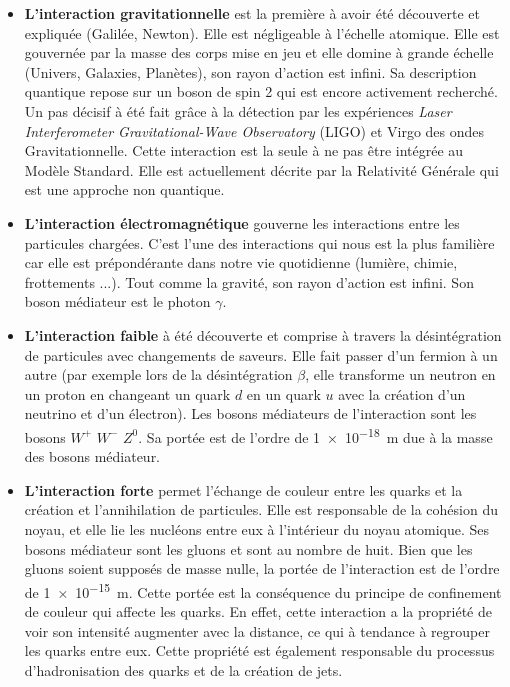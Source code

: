 \begin{itemize}[label=$\bullet$]
\item \textbf{L'interaction gravitationnelle} est la première à avoir été découverte et expliquée (Galilée, Newton). Elle est négligeable à l'échelle atomique. Elle est gouvernée par la masse des corps mise en jeu et elle domine à grande échelle (Univers, Galaxies, Planètes), son rayon d'action est infini. Sa description quantique repose sur un boson de spin \num{2} qui est encore activement recherché. Un pas décisif à été fait grâce à la détection par les expériences \textit{Laser Interferometer Gravitational-Wave Observatory} (LIGO) et Virgo des ondes Gravitationnelle. Cette interaction est la seule à ne pas être intégrée au Modèle Standard. Elle est actuellement décrite par la Relativité Générale qui est une approche non quantique.

\item \textbf{L'interaction électromagnétique} gouverne les interactions entre les particules chargées. C'est l'une des interactions qui nous est la plus familière car elle est prépondérante dans notre vie quotidienne (lumière, chimie, frottements ...). Tout comme la gravité, son rayon d'action est infini. Son boson médiateur est le photon $\gamma$.

\item \textbf{L'interaction faible} à été découverte et comprise à travers la désintégration de particules avec changements de saveurs. Elle fait passer d'un fermion à un autre (par exemple lors de la désintégration $\beta$, elle transforme un neutron en un proton en changeant un quark $d$ en un quark $u$ avec la création d'un neutrino et d'un électron). Les bosons médiateurs de l'interaction sont les bosons $W^{+}$ $W^{-}$ $Z^{0}$. Sa portée est de l'ordre de \SI{1e-18}{\meter} due à la masse des bosons médiateur.

\item \textbf{L'interaction forte} permet l'échange de couleur entre les quarks et la création et l'annihilation de particules. Elle est responsable de la cohésion du noyau, et elle lie les nucléons entre eux à l'intérieur du noyau atomique. Ses bosons médiateur sont les gluons et sont au nombre de huit. Bien que les gluons soient supposés de masse nulle, la portée de l'interaction est de l'ordre de \SI{1e-15}{\meter}. Cette portée est la conséquence du principe de confinement de couleur qui affecte les quarks. En effet, cette interaction a la propriété de voir son intensité augmenter avec la distance, ce qui à tendance à regrouper les quarks entre eux. Cette propriété est également responsable du processus d'hadronisation des quarks et de la création de jets.
\end{itemize}

